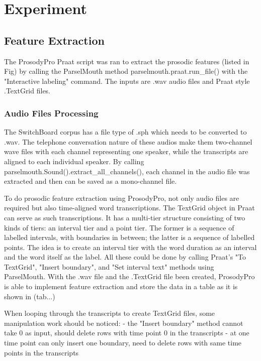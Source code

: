 \chapter{Experiment}

\section{Feature Extraction}
The ProsodyPro Praat script was ran to extract the prosodic features (listed in Fig) by calling the ParselMouth method parselmouth.praat.run\_file() with the "Interactive labeling" command. The inputs are .wav audio files and Praat style .TextGrid files.  

\subsection{Audio Files Processing}
The SwitchBoard corpus has a file type of .sph which needs to be converted to .wav. The telephone conversation nature of these audios make them two-channel wave files with each channel representing one speaker, while the transcripts are aligned to each individual speaker. By calling parselmouth.Sound().extract\_all\_channels(), each channel in the audio file was extracted and then can be saved as a mono-channel file.

To do prosodic feature extraction using ProsodyPro, not only audio files are required but also time-aligned word transcriptions. The TextGrid object in Praat can serve as such transcriptions. It has a multi-tier structure consisting of two kinds of tiers: an interval tier and a point tier. The former is a sequence of labelled intervals, with boundaries in between; the latter is a sequence of labelled points. The idea is to create an interval tier with the word duration as an  interval and the word itself as the label. All these could be done by calling Praat's "To TextGrid", "Insert boundary", and "Set interval text" methods using ParselMouth. With the .wav file and the .TextGrid file been created, ProsodyPro is able to implement feature extraction and store the data in a table as it is shown in (tab...)

When looping through the transcripts to create TextGrid files, some manipulation work should be noticed:
- the "Insert boundary" method cannot take 0 as input, should delete rows with time point 0 in the transcripts
- at one time point can only insert one boundary, need to delete rows with same time points in the transcripts

